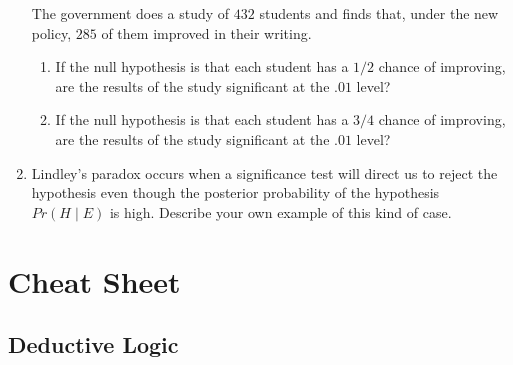 \documentclass[justified]{tufte-book}
\providecommand{\tightlist}{%
  \setlength{\itemsep}{0pt}\setlength{\parskip}{0pt}}
\newcommand{\given}{\mid}
\newcommand{\p}{Pr}
\theoremstyle{definition}
\theoremstyle{definition}
\theoremstyle{definition}
\theoremstyle{remark}
\begin{document}
\begin{enumerate}
  The government does a study of \(432\) students and finds that, under
  the new policy, \(285\) of them improved in their writing.

  \begin{enumerate}
  \def\labelenumii{\alph{enumii}.}
  \tightlist
  \item
    If the null hypothesis is that each student has a \(1/2\) chance of
    improving, are the results of the study significant at the \(.01\)
    level?
  \item
    If the null hypothesis is that each student has a \(3/4\) chance of
    improving, are the results of the study significant at the \(.01\)
    level?
  \end{enumerate}
\item
  Lindley's paradox occurs when a significance test will direct us to
  reject the hypothesis even though the posterior probability of the
  hypothesis \(\p(H \given E)\) is high. Describe your own example of
  this kind of case.
\end{enumerate}

\hypertarget{appendix-appendix}{%
\appendix}


\hypertarget{cheat-sheet}{%
\chapter{Cheat Sheet}\label{cheat-sheet}}

\hypertarget{deductive-logic}{%
\section*{Deductive Logic}\label{deductive-logic}}
\end{document}
